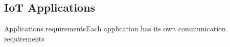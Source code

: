 \subsection{IoT Applications}
\begin{frame}{Applications requirements}{Each application has its own communication requirements}


\end{frame}

